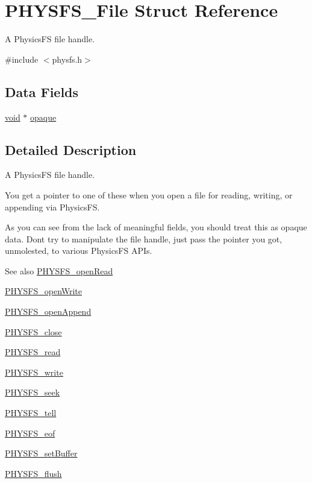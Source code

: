 \hypertarget{struct_p_h_y_s_f_s___file}{}\section{P\+H\+Y\+S\+F\+S\+\_\+\+File Struct Reference}
\label{struct_p_h_y_s_f_s___file}


A Physics\+FS file handle.  




{\ttfamily \#include $<$physfs.\+h$>$}

\subsection*{Data Fields}
\begin{DoxyCompactItemize}
\item 
\hyperlink{png_8h_ac9c84fa68bbad002983e35ce3663c686}{void} $\ast$ \hyperlink{struct_p_h_y_s_f_s___file_a594c10e8f0537c4f2cd8f58f5bc8a748}{opaque}
\end{DoxyCompactItemize}


\subsection{Detailed Description}
A Physics\+FS file handle. 

You get a pointer to one of these when you open a file for reading, writing, or appending via Physics\+FS.

As you can see from the lack of meaningful fields, you should treat this as opaque data. Don\textquotesingle{}t try to manipulate the file handle, just pass the pointer you got, unmolested, to various Physics\+FS A\+P\+Is.

\begin{DoxySeeAlso}{See also}
\hyperlink{physfs_8h_a5e38a425bb0b44c09ec25b105f770c63}{P\+H\+Y\+S\+F\+S\+\_\+open\+Read} 

\hyperlink{physfs_8h_abbf92d66c6cb82d0ede969aa2c964fba}{P\+H\+Y\+S\+F\+S\+\_\+open\+Write} 

\hyperlink{physfs_8h_abeeca12e2fe7c5f68cbd67e2e5cafa3d}{P\+H\+Y\+S\+F\+S\+\_\+open\+Append} 

\hyperlink{physfs_8h_a6822f8ff10073e855a1c3a6485b882f2}{P\+H\+Y\+S\+F\+S\+\_\+close} 

\hyperlink{physfs_8h_a91234f576477f7de67d635761d01aa7b}{P\+H\+Y\+S\+F\+S\+\_\+read} 

\hyperlink{physfs_8h_af5dc83d5e4ef0b0c9bce1834ea1bb498}{P\+H\+Y\+S\+F\+S\+\_\+write} 

\hyperlink{physfs_8h_ae562b45b1e1b02505ce1d82ad785f04a}{P\+H\+Y\+S\+F\+S\+\_\+seek} 

\hyperlink{physfs_8h_a0d481bdd4cf32ed1a41540ee59840c24}{P\+H\+Y\+S\+F\+S\+\_\+tell} 

\hyperlink{physfs_8h_a6d7ac838797951323072060392645dbe}{P\+H\+Y\+S\+F\+S\+\_\+eof} 

\hyperlink{physfs_8h_aede5de47197e1a613d2091802befc886}{P\+H\+Y\+S\+F\+S\+\_\+set\+Buffer} 

\hyperlink{physfs_8h_a3fd8f9cfdfd09f4fb778a386d8e97e8a}{P\+H\+Y\+S\+F\+S\+\_\+flush} 
\end{DoxySeeAlso}


